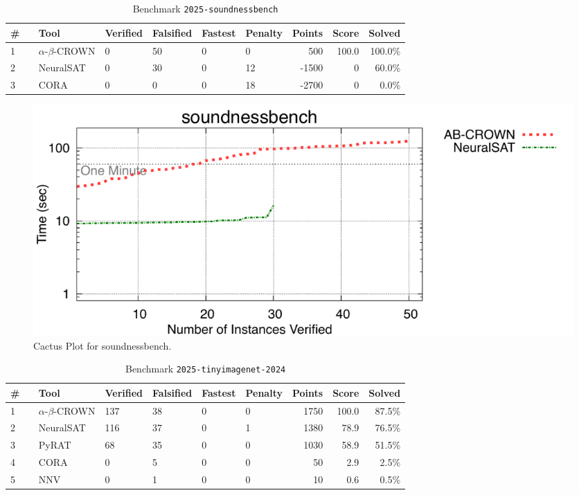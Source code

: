 \begin{table}[h]
\begin{center}
\caption{Benchmark \texttt{2025-soundnessbench}} \label{tab:cat_2025_soundnessbench}
{\setlength{\tabcolsep}{2pt}
\begin{tabular}[h]{@{}llllllrrr@{}}
\toprule
\textbf{\# ~} & \textbf{Tool} & \textbf{Verified} & \textbf{Falsified} & \textbf{Fastest} & \textbf{Penalty} & \textbf{Points} & \textbf{Score} & \textbf{Solved}\\
\midrule
1 & $\alpha$-$\beta$-CROWN & 0 & 50 & 0 & 0 & 500 & 100.0 & 100.0\% \\
2 & NeuralSAT & 0 & 30 & 0 & 12 & -1500 & 0 & 60.0\% \\
3 & CORA & 0 & 0 & 0 & 18 & -2700 & 0 & 0.0\% \\
\bottomrule
\end{tabular}
}
\end{center}
\end{table}



\begin{figure}[h]
\centerline{\includegraphics[width=\textwidth]{cactus/2025_soundnessbench.pdf}}
\caption{Cactus Plot for soundnessbench.}
\label{fig:quantPic}
\end{figure}


\clearpage

\begin{table}[h]
\begin{center}
\caption{Benchmark \texttt{2025-tinyimagenet-2024}} \label{tab:cat_2025_tinyimagenet_2024}
{\setlength{\tabcolsep}{2pt}
\begin{tabular}[h]{@{}llllllrrr@{}}
\toprule
\textbf{\# ~} & \textbf{Tool} & \textbf{Verified} & \textbf{Falsified} & \textbf{Fastest} & \textbf{Penalty} & \textbf{Points} & \textbf{Score} & \textbf{Solved}\\
\midrule
1 & $\alpha$-$\beta$-CROWN & 137 & 38 & 0 & 0 & 1750 & 100.0 & 87.5\% \\
2 & NeuralSAT & 116 & 37 & 0 & 1 & 1380 & 78.9 & 76.5\% \\
3 & PyRAT & 68 & 35 & 0 & 0 & 1030 & 58.9 & 51.5\% \\
4 & CORA & 0 & 5 & 0 & 0 & 50 & 2.9 & 2.5\% \\
5 & NNV & 0 & 1 & 0 & 0 & 10 & 0.6 & 0.5\% \\
\bottomrule
\end{tabular}
}
\end{center}
\end{table}



